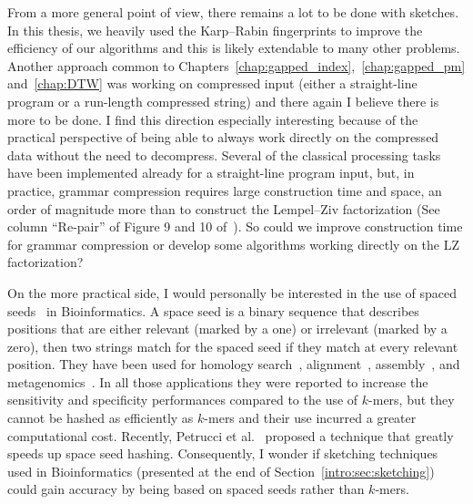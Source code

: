 From a more general point of view, there remains a lot to be done with sketches. In this thesis, we heavily used the Karp--Rabin fingerprints to improve the efficiency of our algorithms and this is likely extendable to many other problems. Another approach common to Chapters~\ref*{chap:gapped_index},~\ref*{chap:gapped_pm} and~\ref*{chap:DTW} was working on compressed input (either a straight-line program or a run-length compressed string) and there again I believe there is more to be done. I find this direction especially interesting because of the practical perspective of being able to always work directly on the compressed data without the need to decompress. Several of the classical processing tasks have been implemented already for a straight-line program input, but, in practice, grammar compression requires large construction time and space, an order of magnitude more than to construct the Lempel--Ziv factorization (See column ``Re-pair'' of Figure 9 and 10 of~\cite{DBLP:journals/jcss/ClaudeNP21}). So could we improve construction time for grammar compression or develop some algorithms working directly on the LZ factorization?


On the more practical side, I would personally be interested in the use of spaced seeds~\cite{li2004patternhunter} in Bioinformatics. A space seed is a binary sequence that describes positions that are either relevant (marked by a one) or irrelevant (marked by a zero), then two strings match for the spaced seed if they match at every relevant position.
They have been used for homology search~\cite{ma2002patternhunter}, alignment~\cite{david2011shrimp2}, assembly~\cite{birol2015spaced}, and metagenomics~\cite{bvrinda2015spaced}. In all those applications they were reported to increase the sensitivity and specificity performances compared to the use of $k$-mers, but they cannot be hashed as efficiently as $k$-mers and their use incurred a greater computational cost. Recently, Petrucci et al.~\cite{petrucci2020iterative} proposed a technique that greatly speeds up space seed hashing. Consequently, I wonder if sketching techniques used in Bioinformatics (presented at the end of Section~\ref{intro:sec:sketching}) could gain accuracy by being based on spaced seeds rather than $k$-mers.

\backmatter